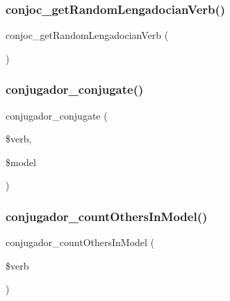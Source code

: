\subsubsection{\texorpdfstring{conjoc\+\_\+get\+Random\+Lengadocian\+Verb()}{conjoc\_getRandomLengadocianVerb()}}
{\footnotesize\ttfamily conjoc\+\_\+get\+Random\+Lengadocian\+Verb (\begin{DoxyParamCaption}{ }\end{DoxyParamCaption})}

\hypertarget{php_2conjoc__web_form_8inc_a5d341264c049e9bda5fd2d0acce4dfd7}{}\label{php_2conjoc__web_form_8inc_a5d341264c049e9bda5fd2d0acce4dfd7} 
\subsubsection{\texorpdfstring{conjugador\+\_\+conjugate()}{conjugador\_conjugate()}}
{\footnotesize\ttfamily conjugador\+\_\+conjugate (\begin{DoxyParamCaption}\item[{}]{\$verb,  }\item[{}]{\$model }\end{DoxyParamCaption})}

\hypertarget{php_2conjoc__web_form_8inc_ac96a30f96cb3957ed4ac47c4eb40df10}{}\label{php_2conjoc__web_form_8inc_ac96a30f96cb3957ed4ac47c4eb40df10} 
\subsubsection{\texorpdfstring{conjugador\+\_\+count\+Others\+In\+Model()}{conjugador\_countOthersInModel()}}
{\footnotesize\ttfamily conjugador\+\_\+count\+Others\+In\+Model (\begin{DoxyParamCaption}\item[{}]{\$verb }\end{DoxyParamCaption})}

\hypertarget{php_2conjoc__web_form_8inc_a16562f736e2ff741407adb1ceb3c9170}{}\label{php_2conjoc__web_form_8inc_a16562f736e2ff741407adb1ceb3c9170} 
